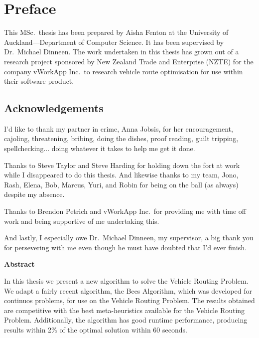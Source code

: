 
\chapter*{Preface}

This MSc.~thesis has been prepared by Aisha Fenton at the University of Auckland---Department of Computer Science. It has been supervised by Dr.~Michael Dinneen. The work undertaken in this thesis has grown out of a research project sponsored by New Zealand Trade and Enterprise (NZTE) for the company vWorkApp Inc.~to research vehicle route optimisation for use within their software product.

\section*{Acknowledgements}

I'd like to thank my partner in crime, Anna Jobsis, for her encouragement, cajoling, threatening, bribing, doing the dishes, proof reading, guilt tripping, spellchecking... doing whatever it takes to help me get it done.

Thanks to Steve Taylor and Steve Harding for holding down the fort at work while I disappeared to do this thesis. And likewise thanks to my team, Jono, Rash, Elena, Bob, Marcus, Yuri, and Robin for being on the ball (as always) despite my absence.

Thanks to Brendon Petrich and vWorkApp Inc.~for providing me with time off work and being supportive of me undertaking this. 

And lastly, I especially owe Dr.~Michael Dinneen, my supervisor, a big thank you for persevering with me even though he must have doubted that I'd ever finish.

\cleardoublepage

\begin{center}
   \begin{minipage}{300pt}
   \begin{center}
      \textbf{Abstract}
   \end{center}
   In this thesis we present a new algorithm to solve the Vehicle Routing Problem. We adapt a fairly recent algorithm, the Bees Algorithm, which was developed for continuos problems, for use on the Vehicle Routing Problem. The results obtained are competitive with the best meta-heuristics available for the Vehicle Routing Problem. Additionally, the algorithm has good runtime performance, producing results within 2\% of the optimal solution within 60 seconds.
   \end{minipage}
\end{center}

\cleardoublepage
